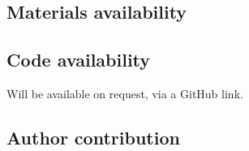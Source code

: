 \documentclass[referee, sn-mathphys-num]{sn-jnl}
\begin{document}
	\subsection*{Materials availability}
	\subsection*{Code availability}
	Will be available on request, via a GitHub link.
	\subsection*{Author contribution}
	
\end{document}
